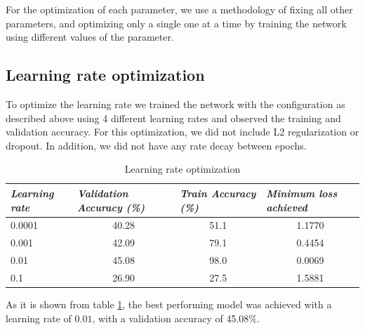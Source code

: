 \documentclass[12pt,twoside]{article}
\begin{document}
For the optimization of each parameter, we use a methodology of fixing all other parameters, and optimizing only a single one at a time by training the network using different values of the parameter.
\subsection{Learning rate optimization}

To optimize the learning rate we trained the network with the configuration as described above  using 4 different learning rates and observed the training and validation accuracy. For this optimization, we did not include L2 regularization or dropout. In addition, we did not have any rate decay between epochs.


\begin{table}[!htbp]
\centering
\label{my-label}
\begin{tabular}{|l|c|c|c|}
\hline
\textit{\textbf{Learning rate}} & \multicolumn{1}{l|}{\textit{\textbf{Validation Accuracy (\%)}}} & \multicolumn{1}{l|}{\textit{\textbf{Train Accuracy (\%)}}} & \multicolumn{1}{l|}{\textit{\textbf{Minimum loss achieved}}} \\ \hline
0.0001                          & 40.28                                                           & 51.1                                                       & 1.1770                                                       \\ \hline
0.001                           & 42.09                                                           & 79.1                                                       & 0.4454                                                       \\ \hline
0.01                            & 45.08                                                           & 98.0                                                       & 0.0069                                                       \\ \hline
0.1                             & 26.90                                                           & 27.5                                                       & 1.5881                                                       \\ \hline
\end{tabular}
\caption{Learning rate optimization}
\label{Learning rate optimization}
\end{table}

As it is shown from table \ref{Learning rate optimization}, the best performing model was achieved with a learning rate of $0.01$, with a validation accuracy of 45.08\%.
\end{document}
